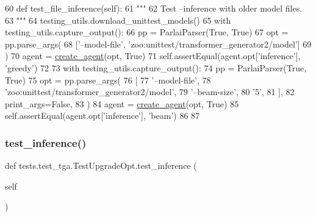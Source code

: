 \begin{DoxyCode}
60     \textcolor{keyword}{def }test\_file\_inference(self):
61         \textcolor{stringliteral}{"""}
62 \textcolor{stringliteral}{        Test --inference with older model files.}
63 \textcolor{stringliteral}{        """}
64         testing\_utils.download\_unittest\_models()
65         with testing\_utils.capture\_output():
66             pp = ParlaiParser(\textcolor{keyword}{True}, \textcolor{keyword}{True})
67             opt = pp.parse\_args(
68                 [\textcolor{stringliteral}{'--model-file'}, \textcolor{stringliteral}{'zoo:unittest/transformer\_generator2/model'}]
69             )
70             agent = \hyperlink{namespaceparlai_1_1core_1_1agents_a00d77a7e26fb89e8bd900f7b2a02982a}{create\_agent}(opt, \textcolor{keyword}{True})
71             self.assertEqual(agent.opt[\textcolor{stringliteral}{'inference'}], \textcolor{stringliteral}{'greedy'})
72 
73         with testing\_utils.capture\_output():
74             pp = ParlaiParser(\textcolor{keyword}{True}, \textcolor{keyword}{True})
75             opt = pp.parse\_args(
76                 [
77                     \textcolor{stringliteral}{'--model-file'},
78                     \textcolor{stringliteral}{'zoo:unittest/transformer\_generator2/model'},
79                     \textcolor{stringliteral}{'--beam-size'},
80                     \textcolor{stringliteral}{'5'},
81                 ],
82                 print\_args=\textcolor{keyword}{False},
83             )
84             agent = \hyperlink{namespaceparlai_1_1core_1_1agents_a00d77a7e26fb89e8bd900f7b2a02982a}{create\_agent}(opt, \textcolor{keyword}{True})
85             self.assertEqual(agent.opt[\textcolor{stringliteral}{'inference'}], \textcolor{stringliteral}{'beam'})
86 
87 
\end{DoxyCode}
\mbox{\label{classtests_1_1test__tga_1_1TestUpgradeOpt_acaefe84187dab5f848fa33afae999144}} 
\subsubsection{\texorpdfstring{test\+\_\+inference()}{test\_inference()}}
{\footnotesize\ttfamily def tests.\+test\+\_\+tga.\+Test\+Upgrade\+Opt.\+test\+\_\+inference (\begin{DoxyParamCaption}\item[{}]{self }\end{DoxyParamCaption})}

